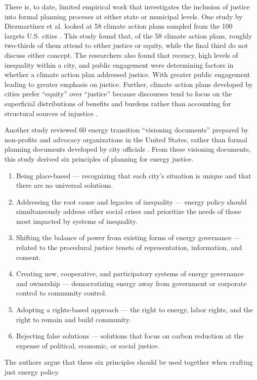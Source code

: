 There is, to date, limited empirical work that investigates the inclusion of
justice into formal planning proceses at either state or municipal levels. One
study by Diezmart\'inez et al. looked at 58 climate action plans sampled from
the 100 largets U.S. cities \cite{diezmartinez_us_2022}. This study found that,
of the 58 climate action plans, roughly two-thirds of them attend to either
justice or equity, while the final third do not discuss either concept. The
researchers also found that recency, high levels of inequality within a city,
and public engagement were determining factors in whether a climate action plan
addressed justice. With greater public engagement leading to greater emphasis on
justice. Further, climate action plans developed by cities prefer ``equity''
over ``justice'' because discourses tend to focus on the superficial
distributions of benefits and burdens rather than accounting for structural
sources of injustice \cite{diezmartinez_us_2022}.

Another study reviewed 60 energy transition ``visioning documents'' prepared by
non-profits and advocacy organizations in the United States, rather than formal
planning documents developed by city officials \cite{elmallah_frontlining_2022}.
From these visioning documents, this study derived six principles of planning
for energy justice.
\begin{enumerate}
    \item Being place-based --- recognizing that each city's situation is unique
    and that there are no universal solutions.
    \item Addressing the root cause and legacies of inequality --- energy policy
    should simultaneously address other social crises and prioritize the needs
    of those most impacted by systems of inequality.
    \item Shifting the balance of power from existing forms of energy governance
    --- related to the procedural justice tenets of representation, information,
    and consent.
    \item Creating new, cooperative, and participatory systems of energy
    governance and ownership --- democratizing energy away from government or
    corporate control to community control.
    \item Adopting a rights-based approach --- the right to energy, labor
    rights, and the right to remain and build community.
    \item Rejecting false solutions --- solutions that focus on carbon reduction
    at the expense of political, economic, or social justice.
\end{enumerate}
The authors argue that these six principles should be used together when
crafting just energy policy.

